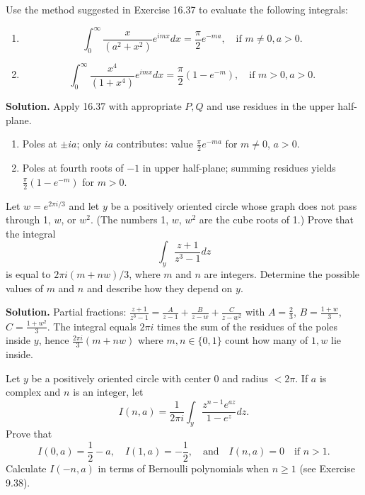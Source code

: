 \begin{problembox}
Use the method suggested in Exercise 16.37 to evaluate the following integrals:
\begin{enumerate}[label=(\alph*)]
\item \[ \int_0^{\infty} \frac{x}{(a^2 + x^2)} e^{imx} dx = \frac{\pi}{2} e^{-ma}, \quad \text{if } m \neq 0, a > 0. \]
\item \[ \int_0^{\infty} \frac{x^4}{(1 + x^4)} e^{imx} dx = \frac{\pi}{2} (1 - e^{-m}), \quad \text{if } m > 0, a > 0. \]
\end{enumerate}
\end{problembox}

\noindent\textbf{Solution.}
Apply 16.37 with appropriate $P,Q$ and use residues in the upper half-plane.
\begin{enumerate}[label=(\alph*)]
\item Poles at $\pm ia$; only $ia$ contributes: value $\frac{\pi}{2}e^{-ma}$ for $m\ne0$, $a>0$.
\item Poles at fourth roots of $-1$ in upper half-plane; summing residues yields $\frac{\pi}{2}(1-e^{-m})$ for $m>0$.
\end{enumerate}

\begin{problembox}
Let \( w = e^{2\pi i / 3} \) and let \( y \) be a positively oriented circle whose graph does not pass through 1, \( w \), or \( w^2 \). (The numbers 1, \( w \), \( w^2 \) are the cube roots of 1.) Prove that the integral
\[ \int_y \frac{z + 1}{z^3 - 1} dz \]
is equal to \( 2\pi i (m + n w) / 3 \), where \( m \) and \( n \) are integers. Determine the possible values of \( m \) and \( n \) and describe how they depend on \( y \).
\end{problembox}

\noindent\textbf{Solution.}
Partial fractions: $\frac{z+1}{z^3-1}=\frac{A}{z-1}+\frac{B}{z-w}+\frac{C}{z-w^2}$ with $A=\tfrac{2}{3}$, $B=\tfrac{1+w}{3}$, $C=\tfrac{1+w^2}{3}$. The integral equals $2\pi i$ times the sum of the residues of the poles inside $y$, hence $\frac{2\pi i}{3}(m+n w)$ where $m,n\in\{0,1\}$ count how many of $1,w$ lie inside.

\begin{problembox}
Let \( y \) be a positively oriented circle with center 0 and radius \( < 2\pi \). If \( a \) is complex and \( n \) is an integer, let
\[ I(n, a) = \frac{1}{2\pi i} \int_y \frac{z^{n-1} e^{az}}{1 - e^z} dz. \]
Prove that
\[ I(0, a) = \frac{1}{2} - a, \quad I(1, a) = -\frac{1}{2}, \quad \text{and} \quad I(n, a) = 0 \quad \text{if } n > 1. \]
Calculate \( I(-n, a) \) in terms of Bernoulli polynomials when \( n \geq 1 \) (see Exercise 9.38).
\end{problembox}

